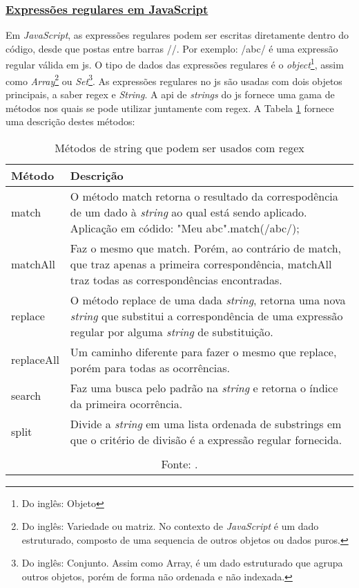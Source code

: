 \subsubsection{\underline{Expressões regulares em JavaScript}}

Em \textit{JavaScript}, as expressões regulares podem ser escritas diretamente dentro do código,
desde que postas entre barras //. Por exemplo: /abc/ é uma expressão regular válida em
\acrshort{js}.
O tipo de dados das expressões regulares é
o
\textit{object}\footnote{Do inglês: Objeto
}, assim como
\textit{Array}\footnote{Do inglês: Variedade ou matriz. No contexto de \textit{JavaScript} é um dado estruturado,
    composto de uma sequencia de outros objetos ou dados puros.
}
ou
\textit{Set}\footnote{Do inglês: Conjunto. Assim como Array, é um dado estruturado que agrupa outros
    objetos, porém de forma não ordenada e não indexada.
}. As expressões regulares no
\acrshort{js}
são usadas com dois objetos principais, a saber
\acrshort{regex}
e
\textit{String}.
A
\acrshort{api}
de \textit{strings} do
\acrshort{js}
fornece uma gama de métodos nos quais se pode utilizar
juntamente com
\acrshort{regex}.
A Tabela \ref{tbl:string-methods-regex}
fornece uma descrição destes métodos:

\begin{table}[H]
    \centering
    \caption{Métodos de string que podem ser usados com regex}
    \label{tbl:string-methods-regex}
    \renewcommand{\arraystretch}{1.5}
    \begin{tabular}{p{2.4000cm} p{13.6000cm}}
        \hline
        \textbf{Método} & \textbf{Descrição} \\
        \hline
        match & O método match retorna o resultado da correspodência de um dado
            \cite{mdn-regex}
            à \textit{string} ao qual está sendo aplicado. Aplicação em códido:
            "Meu abc".match(/abc/);
         \\
		matchAll & Faz o mesmo que match. Porém, ao contrário de match, que traz apenas
            a primeira correspondência, matchAll traz todas as correspondências
            encontradas.
         \\
		replace & O método replace de uma dada \textit{string}, retorna uma nova \textit{string} que substitui
            a correspondência de uma expressão regular por alguma \textit{string} de substituição.
         \\
		replaceAll & Um caminho diferente para fazer o mesmo que replace, porém para todas
            as ocorrências.
         \\
		search & Faz uma busca pelo padrão na \textit{string} e retorna o índice da primeira ocorrência. \\
		split & Divide a \textit{string} em uma lista ordenada de substrings em que o critério de divisão é a expressão regular fornecida. \\
        \hline
        \\\multicolumn{2}{c}{\fontsize{10pt}{12pt}Fonte: \cite{mdn-regex}.}
    \end{tabular}
\end{table}

